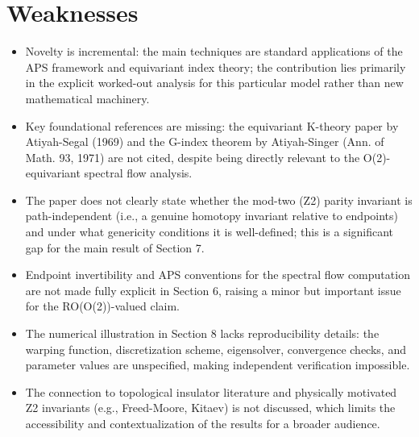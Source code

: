 \documentclass[11pt]{article}
\begin{document}
\section*{Weaknesses}
\begin{itemize}[leftmargin=*]
  \item Novelty is incremental: the main techniques are standard applications of the APS framework and equivariant index theory; the contribution lies primarily in the explicit worked-out analysis for this particular model rather than new mathematical machinery.
  \item Key foundational references are missing: the equivariant K-theory paper by Atiyah-Segal (1969) and the G-index theorem by Atiyah-Singer (Ann. of Math. 93, 1971) are not cited, despite being directly relevant to the O(2)-equivariant spectral flow analysis.
  \item The paper does not clearly state whether the mod-two (Z2) parity invariant is path-independent (i.e., a genuine homotopy invariant relative to endpoints) and under what genericity conditions it is well-defined; this is a significant gap for the main result of Section 7.
  \item Endpoint invertibility and APS conventions for the spectral flow computation are not made fully explicit in Section 6, raising a minor but important issue for the RO(O(2))-valued claim.
  \item The numerical illustration in Section 8 lacks reproducibility details: the warping function, discretization scheme, eigensolver, convergence checks, and parameter values are unspecified, making independent verification impossible.
  \item The connection to topological insulator literature and physically motivated Z2 invariants (e.g., Freed-Moore, Kitaev) is not discussed, which limits the accessibility and contextualization of the results for a broader audience.
\end{itemize}
\end{document}
